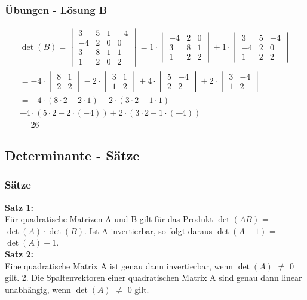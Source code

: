 \begin{frame}
	\frametitle{Übungen - Lösung B}
	\begin{gather*}
	 \det(B) = \begin{vmatrix}
		3 & 5 & 1 & -4 \\
		-4 & 2 & 0 & 0 \\
		3 & 8 & 1 & 1 \\
		1 & 2 & 0 & 2
		\end{vmatrix} 
		= 1 \cdot \begin{vmatrix}
		-4 & 2 & 0 \\
		3 & 8 & 1 \\
		1 & 2 & 2
		\end{vmatrix} + 1 \cdot \begin{vmatrix}
		3 & 5 & -4 \\
		-4 & 2 & 0 \\
		1 & 2 & 2
		\end{vmatrix} \\
		= -4 \cdot \begin{vmatrix} 8 & 1 \\ 2 & 2 \end{vmatrix}
		-2 \cdot \begin{vmatrix} 3 & 1 \\  1 & 2 \end{vmatrix}
		+4 \cdot \begin{vmatrix} 5 & -4 \\ 2 & 2 \end{vmatrix}
		+2 \cdot \begin{vmatrix} 3 & -4 \\ 1 & 2 \end{vmatrix}\\
		= -4 \cdot (8 \cdot 2 - 2 \cdot 1)
		-2 \cdot (3 \cdot 2 - 1 \cdot 1) \\
		+4 \cdot (5 \cdot 2 - 2 \cdot (-4))
		+ 2 \cdot (3 \cdot 2 - 1 \cdot (-4)) \\
		= 26
	\end{gather*}
\end{frame}

\subsection{Determinante - Sätze}
\begin{frame}
	\frametitle{Sätze}
	\textbf{Satz 1:} \\
	Für quadratische Matrizen A und B gilt für das Produkt $\det(AB)$ = $\det(A) \cdot \det(B)$. Ist A invertierbar, so folgt daraus $\det(A-1)$ = $\det(A)-1$. \\
	$ $ \\
	\textbf{Satz 2:} \\
	Eine quadratische Matrix A ist genau dann invertierbar, wenn $\det(A)$ $\neq$ 0 gilt.
2. Die Spaltenvektoren einer quadratischen Matrix A sind genau dann linear unabhängig, wenn
$\det(A)$ $\neq$ 0 gilt. \\
\end{frame}


